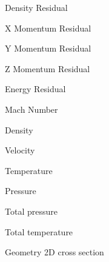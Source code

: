 \begin{DoxyItemize}
\item Density Residual
\item X Momentum Residual
\item Y Momentum Residual
\item Z Momentum Residual
\item Energy Residual
\item Mach Number
\item Density
\item Velocity
\item Temperature
\item Pressure
\item Total pressure
\item Total temperature
\item Geometry 2D cross section 
\end{DoxyItemize}